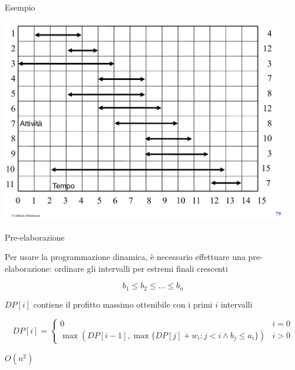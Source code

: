 \begin{frame}{Esempio}

\vspace{-12pt}
\begin{center}
\includegraphics[width=0.95\textwidth,page=2]{intervalli-esempio.pdf}
\end{center}

\end{frame}

\begin{frame}{Pre-elaborazione}

\vspace{-9pt}
Per usare la programmazione dinamica, è necessario effettuare una pre-elaborazione: ordinare gli intervalli per estremi finali crescenti

  \[
     b_1 \leq b_2 \leq \ldots \leq b_n
  \]

$DP[i]$ contiene il profitto massimo ottenibile con i primi $i$ intervalli

\[
  DP[i] = \begin{cases}
    0 & i = 0 \\
    \max (DP[i-1], \max \{ DP[j]+w_i : j < i \wedge b_j \leq a_i \} ) & i > 0
  \end{cases}
\]

\pause 

\smallskip
$O(n^2)$

\end{frame}

